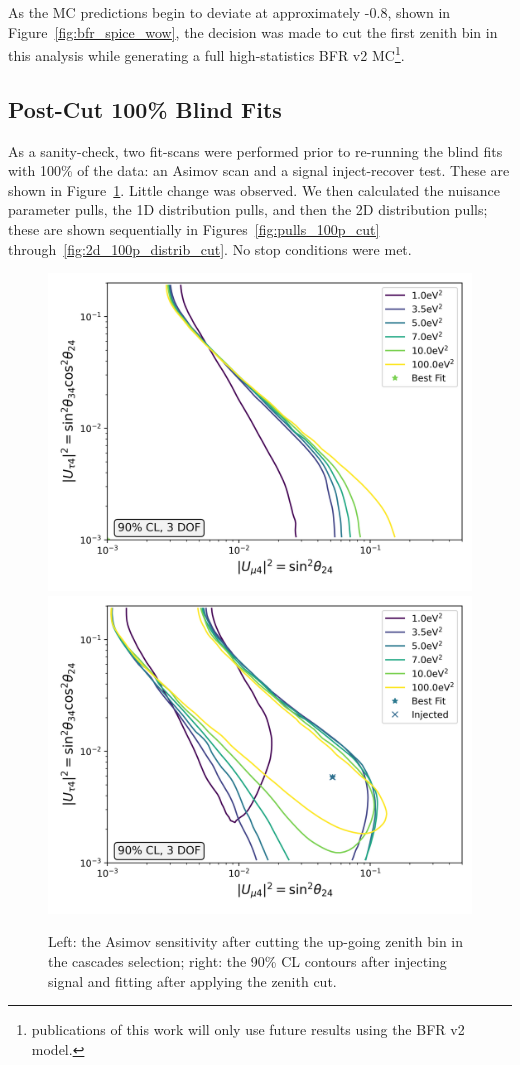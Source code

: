 \documentclass[main.tex]{subfiles}
\begin{document}
As the MC predictions begin to deviate at approximately -0.8, shown in Figure~\ref{fig:bfr_spice_wow}, the decision was made to cut the first zenith bin in this analysis while generating a full high-statistics BFR v2 MC\footnote{publications of this work will only use future results using the BFR v2 model.}. 


\subsection{Post-Cut 100\% Blind Fits}

As a sanity-check, two fit-scans were performed prior to re-running the blind fits with 100\% of the data: an Asimov scan and a signal inject-recover test. 
These are shown in Figure~\ref{fig:new_sense_again_cut}. 
Little change was observed. 
We then calculated the nuisance parameter pulls, the 1D distribution pulls, and then the 2D distribution pulls; these are shown sequentially in Figures~\ref{fig:pulls_100p_cut} through~\ref{fig:2d_100p_distrib_cut}.
No stop conditions were met. 

\begin{figure}
    \centering
    \includegraphics[width=0.45\linewidth]{figures/blindfit/joint_asimov_cut_Realization_daemoncut_Asimov_sterile_0_cl0.9_dof3.png}%
    \includegraphics[width=0.45\linewidth]{figures/blindfit/joint_asimov_cut_signal_Realization_daemoncut_Asimov_sterile_4_cl0.9_dof3.png}
    \caption{Left: the Asimov sensitivity after cutting the up-going zenith bin in the cascades selection; right: the 90\% CL contours after injecting signal and fitting after applying the zenith cut.}\label{fig:new_sense_again_cut}
\end{figure}
\end{document}
